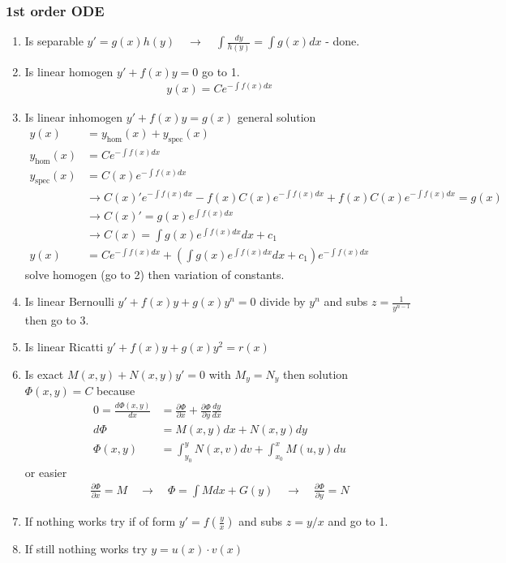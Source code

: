\documentclass[10pt,a4paper]{book}
\theoremstyle{definition}
\begin{document}
\newpage
\subsubsection{1st order ODE}
\begin{enumerate}
\item Is separable $y'=g(x)h(y)\quad\rightarrow\quad \int\frac{dy}{h(y)}=\int g(x)dx$ - done.
\item Is linear homogen $y'+f(x)y=0$ go to 1.
\begin{align}
y(x)=Ce^{-\int f(x)dx}
\end{align}
\item Is linear inhomogen $y'+f(x)y=g(x)$ general solution
\begin{align}
y(x)&=y_\text{hom}(x)+y_\text{spec}(x)\\
y_\text{hom}(x)&=Ce^{-\int f(x)dx}\\
y_\text{spec}(x)&=C(x)e^{-\int f(x)dx}\\
&\rightarrow C(x)'e^{-\int f(x)dx}-f(x)C(x)e^{-\int f(x)dx}+f(x)C(x)e^{-\int f(x)dx}=g(x)\\
&\rightarrow C(x)'=g(x)e^{\int f(x)dx}\\
&\rightarrow C(x)=\int g(x)e^{\int f(x)dx}dx+c_1\\
y(x)&=Ce^{-\int f(x)dx}+\left(\int g(x)e^{\int f(x)dx}dx+c_1\right)e^{-\int f(x)dx}
\end{align}
solve homogen (go to 2) then variation of constants.
\item Is linear Bernoulli $y'+f(x)y+g(x)y^n=0$ divide by $y^n$ and subs $z=\frac{1}{y^{n-1}}$ then go to 3.
\item Is linear Ricatti $y'+f(x)y+g(x)y^2=r(x)$
\item Is exact $M(x,y)+N(x,y)y'=0$ with $M_y=N_y$ then solution $\Phi(x,y)=C$ because
\begin{align}
0=\frac{d\Phi(x,y)}{dx}&=\frac{\partial\Phi}{\partial x}+\frac{\partial\Phi}{\partial y}\frac{dy}{dx}\\
d\Phi&=M(x,y)dx+N(x,y)dy\\
\Phi(x,y)&=\int_{y_0}^yN(x,v)dv+\int_{x_0}^xM(u,y)du
\end{align}
or easier
\begin{align}
\frac{\partial\Phi}{\partial x}=M\quad\rightarrow\quad\Phi=\int M dx+G(y)\quad\rightarrow\quad\frac{\partial\Phi}{\partial y}=N
\end{align}
\item If nothing works try if of form $y'=f\left(\frac{y}{x}\right)$ and subs $z=y/x$ and go to 1.

\item If still nothing works try $y=u(x)\cdot v(x)$
\end{enumerate}
\end{document}
